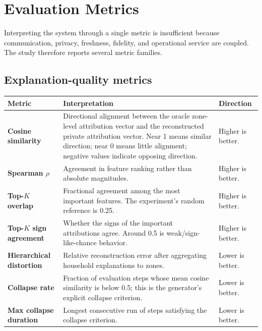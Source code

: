 \documentclass[11pt]{article}
\begin{document}
\section{Evaluation Metrics}
Interpreting the system through a single metric is insufficient because communication, privacy, freshness, fidelity, and operational service are coupled. The study therefore reports several metric families.

\subsection{Explanation-quality metrics}
\begin{center}
\small
\begin{tabularx}{\textwidth}{>{\bfseries}p{} X p{}}
\toprule
Metric & Interpretation & Direction \\
\midrule
Cosine similarity & Directional alignment between the oracle zone-level attribution vector and the reconstructed private attribution vector. Near 1 means similar direction; near 0 means little alignment; negative values indicate opposing direction. & Higher is better. \\
Spearman $\rho$ & Agreement in feature ranking rather than absolute magnitudes. & Higher is better. \\
Top-$K$ overlap & Fractional agreement among the most important features. The experiment's random reference is 0.25. & Higher is better. \\
Top-$K$ sign agreement & Whether the signs of the important attributions agree. Around 0.5 is weak/sign-like-chance behavior. & Higher is better. \\
Hierarchical distortion & Relative reconstruction error after aggregating household explanations to zones. & Lower is better. \\
Collapse rate & Fraction of evaluation steps whose mean cosine similarity is below 0.5; this is the generator's explicit collapse criterion. & Lower is better. \\
Max collapse duration & Longest consecutive run of steps satisfying the collapse criterion. & Lower is better. \\
\bottomrule
\end{tabularx}
\end{center}
\end{document}
